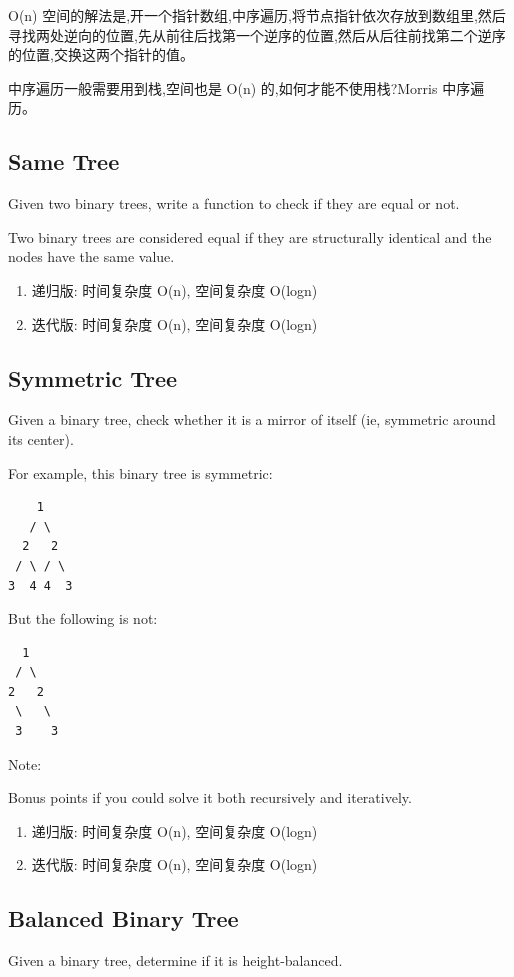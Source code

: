 \documentclass[12pt]{book}
\begin{document}
O(n) 空间的解法是,开一个指针数组,中序遍历,将节点指针依次存放到数组里,然后寻找两处逆向的位置,先从前往后找第一个逆序的位置,然后从后往前找第二个逆序的位置,交换这两个指针的值。

中序遍历一般需要用到栈,空间也是 O(n) 的,如何才能不使用栈?Morris 中序遍历。

\subsection{Same Tree}
\label{sec-4-1-8}
Given two binary trees, write a function to check if they are equal or not.

Two binary trees are considered equal if they are structurally identical and the nodes have the same value.
\begin{enumerate}
\item 递归版: 时间复杂度 O(n), 空间复杂度 O(logn)
\label{sec-4-1-8-1}
\item 迭代版: 时间复杂度 O(n), 空间复杂度 O(logn)
\label{sec-4-1-8-2}
\end{enumerate}

\subsection{Symmetric Tree}
\label{sec-4-1-9}
Given a binary tree, check whether it is a mirror of itself (ie, symmetric around its center).

For example, this binary tree is symmetric:
\lstset{language=java,label= ,caption= ,numbers=none}
\begin{lstlisting}
    1
   / \
  2   2
 / \ / \
3  4 4  3
\end{lstlisting}
But the following is not:
\lstset{language=java,label= ,caption= ,numbers=none}
\begin{lstlisting}
  1
 / \
2   2
 \   \
 3    3
\end{lstlisting}
Note:

Bonus points if you could solve it both recursively and iteratively.
\begin{enumerate}
\item 递归版: 时间复杂度 O(n), 空间复杂度 O(logn)
\label{sec-4-1-9-1}
\item 迭代版: 时间复杂度 O(n), 空间复杂度 O(logn)
\label{sec-4-1-9-2}
\end{enumerate}


\subsection{Balanced Binary Tree}
\label{sec-4-1-10}
Given a binary tree, determine if it is height-balanced.
\end{document}
